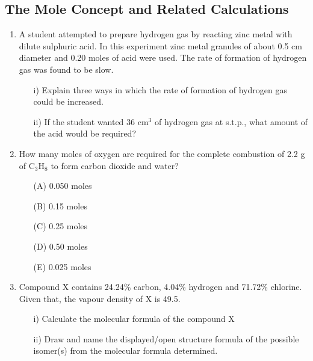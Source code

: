 \subsection{The Mole Concept and Related Calculations}

\begin{enumerate}
	\item A student attempted to prepare hydrogen gas by reacting zinc metal with dilute sulphuric acid. In this experiment zinc metal granules of about 0.5 cm diameter and 0.20 moles of acid were used. The rate of formation of hydrogen gas was found to be slow. 
	\begin{enumerate}[topsep=0ex,itemsep=0ex,partopsep=1ex,parsep=1ex]
		\item[i)] Explain three ways in which the rate of formation of hydrogen gas could be increased.
		\item[ii)] If the student wanted 36 cm$^3$ of hydrogen gas at s.t.p., what amount of the acid would be required?
	\end{enumerate}
	
	\item How many moles of oxygen are required for the complete combustion of 2.2 g of C$_3$H$_8$ to form carbon dioxide and water?
		\begin{enumerate}[topsep=0ex,itemsep=0ex,partopsep=1ex,parsep=1ex]
		\item[(A)] 0.050 moles
		\item[(B)] 0.15 moles
		\item[(C)] 0.25 moles
		\item[(D)] 0.50 moles
		\item[(E)] 0.025 moles
	\end{enumerate}
	
	\item Compound X contains 24.24\% carbon, 4.04\% hydrogen and 71.72\% chlorine. Given that, the vapour density of X is 49.5.
		\begin{enumerate}[topsep=0ex,itemsep=0ex,partopsep=1ex,parsep=1ex]
		\item[i)] Calculate the molecular formula of the compound X
		\item[ii)] Draw and name the displayed\slash open structure formula of the possible isomer(s) from the molecular formula determined.
	\end{enumerate}
	
\end{enumerate}









